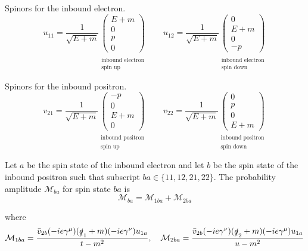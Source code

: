 Spinors for the inbound electron.
\begin{equation*}
u_{11}=\frac{1}{\sqrt{E+m}}
\underset{\substack{\\ \text{inbound electron}\\ \text{spin up}}}
{\begin{pmatrix}E+m\\0\\p\\0\end{pmatrix}}
\qquad
u_{12}=\frac{1}{\sqrt{E+m}}
\underset{\substack{\\ \text{inbound electron}\\ \text{spin down}}}
{\begin{pmatrix}0\\E+m\\0\\-p\end{pmatrix}}
\end{equation*}

Spinors for the inbound positron.
\begin{equation*}
v_{21}=\frac{1}{\sqrt{E+m}}
\underset{\substack{\\ \text{inbound positron}\\ \text{spin up}}}
{\begin{pmatrix}-p\\0\\E+m\\0\end{pmatrix}}
\qquad
v_{22}=\frac{1}{\sqrt{E+m}}
\underset{\substack{\\ \text{inbound positron}\\ \text{spin down}}}
{\begin{pmatrix}0\\p\\0\\E+m\end{pmatrix}}
\end{equation*}

Let $a$ be the spin state of the inbound electron and let $b$
be the spin state of the inbound positron
such that subscript $ba\in\{11,12,21,22\}$.
The probability amplitude $\mathcal M_{ba}$ for spin state $ba$ is
\begin{equation*}
\mathcal M_{ba}=\mathcal M_{1ba}+\mathcal M_{2ba}
\end{equation*}

where
\begin{equation*}
\mathcal M_{1ba}=\frac{\bar{v}_{2b}(-ie\gamma^\mu)(\slashed q_1+m)(-ie\gamma^\nu)u_{1a}}{t-m^2},
\quad
\mathcal M_{2ba}=\frac{\bar{v}_{2b}(-ie\gamma^\nu)(\slashed q_2+m)(-ie\gamma^\mu)u_{1a}}{u-m^2}
\end{equation*}

